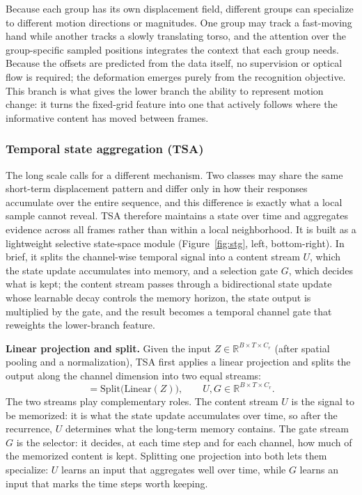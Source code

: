 Because each group has its own displacement field, different groups can
specialize to different motion directions or magnitudes. One group may track a
fast-moving hand while another tracks a slowly translating torso, and the
attention over the group-specific sampled positions integrates the context
that each group needs. Because
the offsets are predicted from the data itself, no supervision or optical flow
is required; the deformation emerges purely from the recognition objective.
This branch is what gives the lower branch the ability to represent motion
change: it turns the fixed-grid feature into one that actively follows where
the informative content has moved between frames.

\subsubsection{Temporal state aggregation (TSA)}
\label{sec:tsa}

The long scale calls for a different mechanism. Two classes may share the
same short-term displacement pattern and differ only in how their responses
accumulate over the entire sequence, and this difference is exactly what a
local sample cannot reveal. TSA therefore maintains a state over time and
aggregates evidence across all frames rather than within a local
neighborhood. It is built as a lightweight selective state-space module
(Figure~\ref{fig:stg}, left, bottom-right). In brief, it
splits the channel-wise temporal signal into a content stream $U$, which the
state update accumulates into memory, and a selection gate $G$, which decides
what is kept; the content stream passes through a bidirectional state update
whose learnable decay controls the memory horizon, the state output is
multiplied by the gate, and the result becomes a temporal channel gate that
reweights the lower-branch feature.

\noindent\textbf{Linear projection and split.}
Given the input $Z \in \mathbb{R}^{B \times T \times C_r}$ (after spatial
pooling and a normalization), TSA first applies a linear projection and splits
the output along the channel dimension into two equal streams:
\begin{equation}
  [\,U,\; G\,] = \mathrm{Split}\big(\mathrm{Linear}(Z)\big),
  \qquad U, G \in \mathbb{R}^{B \times T \times C_r}.
\end{equation}
The two streams play complementary roles. The content stream $U$ is the
signal to be memorized: it is what the state update accumulates over time, so
after the recurrence, $U$ determines what the long-term memory contains. The
gate stream $G$ is the selector: it decides, at each time step and for each
channel, how much of the memorized content is kept. Splitting one projection
into both lets them specialize: $U$ learns an input that aggregates well over
time, while $G$ learns an input that marks the time steps worth keeping.

